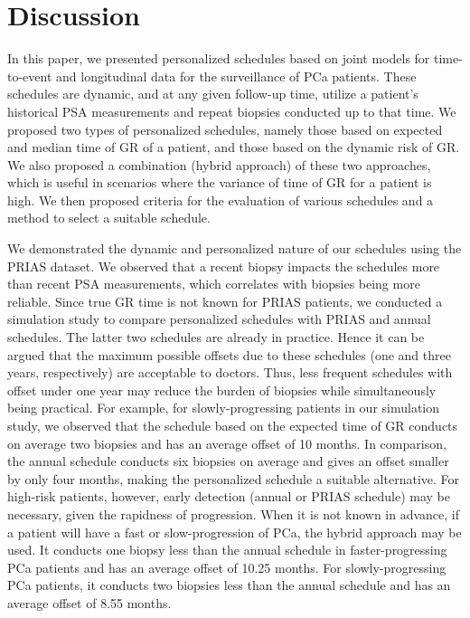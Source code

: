 \section{Discussion}
\label{c2:sec:discussion}
In this paper, we presented personalized schedules based on joint models for time-to-event and longitudinal data for the surveillance of PCa patients. These schedules are dynamic, and at any given follow-up time, utilize a patient's historical PSA measurements and repeat biopsies conducted up to that time. We proposed two types of personalized schedules, namely those based on expected and median time of GR of a patient, and those based on the dynamic risk of GR. We also proposed a combination (hybrid approach) of these two approaches, which is useful in scenarios where the variance of time of GR for a patient is high. We then proposed criteria for the evaluation of various schedules and a method to select a suitable schedule.

We demonstrated the dynamic and personalized nature of our schedules using the PRIAS dataset. We observed that a recent biopsy impacts the schedules more than recent PSA measurements, which correlates with biopsies being more reliable. Since true GR time is not known for PRIAS patients, we conducted a simulation study to compare personalized schedules with PRIAS and annual schedules. The latter two schedules are already in practice. Hence it can be argued that the maximum possible offsets due to these schedules (one and three years, respectively) are acceptable to doctors. Thus, less frequent schedules with offset under one year may reduce the burden of biopsies while simultaneously being practical. For example, for slowly-progressing patients in our simulation study, we observed that the schedule based on the expected time of GR conducts on average two biopsies and has an average offset of 10 months. In comparison, the annual schedule conducts six biopsies on average and gives an offset smaller by only four months, making the personalized schedule a suitable alternative. For high-risk patients, however, early detection (annual or PRIAS schedule) may be necessary, given the rapidness of progression. When it is not known in advance, if a patient will have a fast or slow-progression of PCa, the hybrid approach may be used. It conducts one biopsy less than the annual schedule in faster-progressing PCa patients and has an average offset of 10.25 months. For slowly-progressing PCa patients, it conducts two biopsies less than the annual schedule and has an average offset of 8.55 months.

